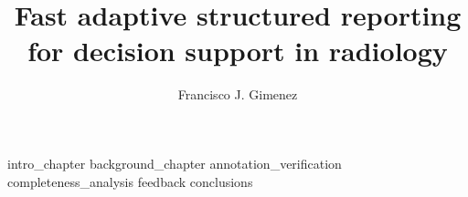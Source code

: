 \documentclass[12pt,twoside]{report}		%
\title{Fast adaptive structured reporting for decision support in radiology}
\author{Francisco J. Gimenez}
\begin{document}
\beforepreface						%



\ifproposal 						%
\else 
	 
\fi	


{ \hypersetup{hidelinks}			%
  \contentstablesfigures }			%
\startmaindoc						%


{intro_chapter}
{background_chapter}
{annotation_verification}
{completeness_analysis}
{feedback}
{conclusions}





%


\end{document}
